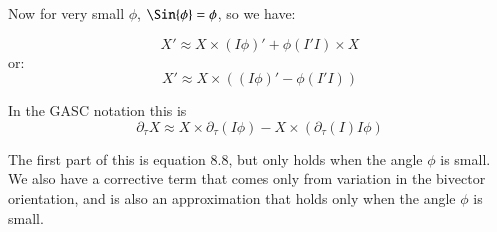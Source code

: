 \documentclass{article}      %
\begin{document}
Now for very small $\phi$, $\Sin{\phi} = \phi$, so we have:

\[
X' \approx X \times (I \phi)' + \phi ( I'I ) \times X
\]
or:
\[
X' \approx X \times \left( (I \phi)' - \phi ( I'I ) \right)
\]

In the GASC notation this is
\[
\partial_\tau X \approx X \times \partial_\tau (I \phi) - X \times (\partial_\tau(I) I \phi)
\]

The first part of this is equation 8.8, but only holds when the angle $\phi$ is small.  We also have a corrective term that comes only from variation in the bivector orientation, and is also an approximation that holds only when the angle $\phi$ is small.
\end{document}
